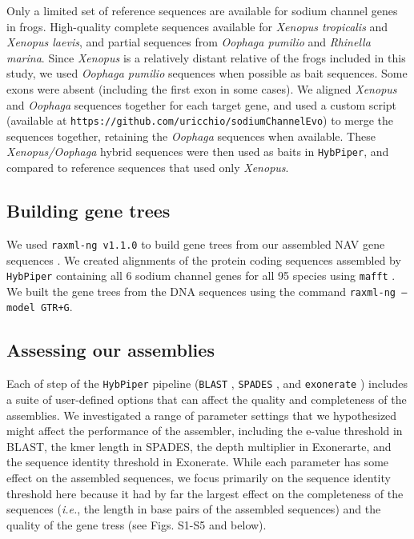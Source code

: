 \documentclass{article}
\begin{document}
Only a limited set of reference sequences are available for sodium channel genes in frogs.  High-quality complete sequences available for \textit{Xenopus tropicalis} and \textit{Xenopus laevis}, and partial sequences from \textit{Oophaga pumilio} and \textit{Rhinella marina}.  Since \textit{Xenopus} is a relatively distant relative of the frogs included in this study, we used \textit{Oophaga pumilio} sequences when possible as bait sequences. Some exons were absent (including the first exon in some cases).  We aligned \textit{Xenopus} and \textit{Oophaga} sequences together for each target gene, and used a custom script (available at \texttt{https://github.com/uricchio/sodiumChannelEvo}) to merge the sequences together, retaining the \textit{Oophaga} sequences when available. These \textit{Xenopus/Oophaga} hybrid sequences were then used as baits in \texttt{HybPiper}, and compared to reference sequences that used only \textit{Xenopus}.

\subsection*{Building gene trees}
We used \texttt{raxml-ng v1.1.0} to build gene trees from our assembled NAV gene sequences \cite{kozlov2019raxml}. We created alignments of the protein coding sequences assembled by \texttt{HybPiper} containing all 6 sodium channel genes for all 95 species using \texttt{mafft} \cite{katoh2005mafft}.  We built the gene trees from the DNA sequences using the command \texttt{raxml-ng --model GTR+G}. 

\subsection*{Assessing our assemblies}
 
Each of step of the \texttt{HybPiper} pipeline (\texttt{BLAST} \citep{altschul1990basic}, \texttt{SPADES} \citep{bankevich2012spades}, and \texttt{exonerate} \citep{slater2005automated}) includes a suite of user-defined options that can affect the quality and completeness of the assemblies. We investigated a range of parameter settings that we hypothesized might affect the performance of the assembler, including the e-value threshold in BLAST, the kmer length in SPADES, the depth multiplier in Exonerarte, and the sequence identity threshold in Exonerate. While each parameter has some effect on the assembled sequences, we focus primarily on the sequence identity threshold here because it had by far the largest effect on the completeness of the sequences (\textit{i.e.}, the length in base pairs of the assembled sequences) and the quality of the gene tress (see Figs. S1-S5 and below).
\end{document}
